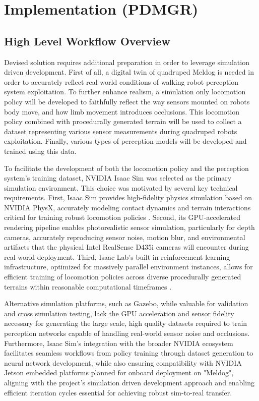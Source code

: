 \section{Implementation (PDMGR)}

\subsection{High Level Workflow Overview}
\label{ssec:workflow_overwiev}
Devised solution requires additional preparation in order to leverage simulation driven development. First of all, a digital twin of quadruped Meldog is needed in order to accurately reflect real world conditions of walking robot perception system exploitation. To further enhance realism, a simulation only locomotion policy will be developed to faithfully reflect the way sensors mounted on robots body move, and how limb movement introduces occlusions. This locomotion policy combined with procedurally generated terrain will be used to collect a dataset representing various sensor measurements during quadruped robots exploitation. Finally, various types of perception models will be developed and trained using this data.

To facilitate the development of both the locomotion policy and the perception system's training dataset, NVIDIA Isaac Sim was selected as the primary simulation environment. This choice was motivated by several key technical requirements. First, Isaac Sim provides high-fidelity physics simulation based on NVIDIA PhysX, accurately modeling contact dynamics and terrain interactions critical for training robust locomotion policies \cite{isaacgym}. Second, its GPU-accelerated rendering pipeline enables photorealistic sensor simulation, particularly for depth cameras, accurately reproducing sensor noise, motion blur, and environmental artifacts that the physical Intel RealSense D435i cameras will encounter during real-world deployment. Third, Isaac Lab's built-in reinforcement learning infrastructure, optimized for massively parallel environment instances, allows for efficient training of locomotion policies across diverse procedurally generated terrains within reasonable computational timeframes \cite{learningtowalk}.

Alternative simulation platforms, such as Gazebo, while valuable for validation and cross simulation testing, lack the GPU acceleration and sensor fidelity necessary for generating the large scale, high quality datasets required to train perception networks capable of handling real-world sensor noise and occlusions. Furthermore, Isaac Sim's integration with the broader NVIDIA ecosystem facilitates seamless workflows from policy training through dataset generation to neural network development, while also ensuring compatibility with NVIDIA Jetson embedded platforms planned for onboard deployment on "Meldog", aligning with the project's simulation driven development approach and enabling efficient iteration cycles essential for achieving robust sim-to-real transfer.

